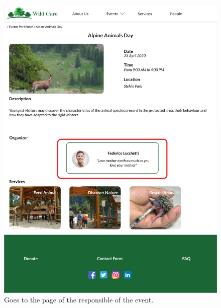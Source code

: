 	\begin{figure}[h!]
		\centering
		\begin{minipage}[b]{1\textwidth}
    			\includegraphics[width=\textwidth]{./assets/mockups/eventdetails_persondetails.png}
			\caption{Goes to the page of the responsible of the event.}
		\end{minipage}
	\end{figure}

